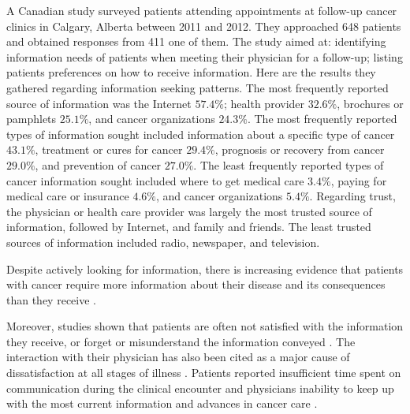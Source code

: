 A Canadian study surveyed patients attending appointments at follow-up cancer clinics in Calgary, Alberta \cite{sheabudgell_information_2014} between 2011 and 2012. They approached 648 patients and obtained responses from 411 one of them. The study aimed at: identifying information needs of patients when meeting their physician for a follow-up; listing patients preferences on how to receive information. Here are the results they gathered regarding information seeking patterns. The most frequently reported source of information was the Internet \(57.4\%\); health provider \(32.6\%\), brochures or pamphlets \(25.1\%\), and cancer organizations \(24.3\%\). The most frequently reported types of information sought included information about a specific type of cancer \(43.1\%\), treatment or cures for cancer \(29.4\%\), prognosis or recovery from cancer \(29.0\%\), and prevention of cancer \(27.0\%\). The least frequently reported types of cancer information sought included where to get medical care \(3.4\%\), paying for medical care or insurance \(4.6\%\), and cancer organizations \(5.4\%\). Regarding trust, the physician or health care provider was largely the most trusted source of information, followed by Internet, and family and friends. The least trusted sources of information included radio, newspaper, and television.

Despite actively looking for information, there is increasing evidence that patients with cancer require more information about their disease and its consequences than they receive \cite{mcpherson_effective_2001}.

Moreover, studies shown that patients are often not satisfied with the information they receive, or forget or misunderstand the information conveyed \cite{ley_communicating_1988,hogbin_getting_1989}. The interaction with their physician has also been cited as a major cause of dissatisfaction \cite{stewart_effective_1995,bartlett_effects_1984} at all stages of illness \cite{higginson_palliative_1990}. Patients reported insufficient time spent on communication during the clinical encounter and physicians inability to keep up with the most current information and advances in cancer care \cite{anderson_impact_2003}.

